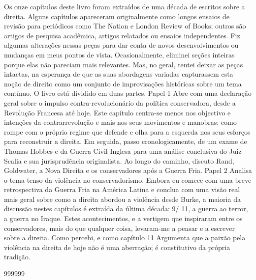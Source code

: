 Os onze capítulos deste livro foram extraídos de uma década de escritos sobre a direita. Alguns capítulos apareceram originalmente como longos ensaios de revisão para periódicos como The Nation e London Review of Books; outros são artigos de pesquisa acadêmica, artigos relatados ou ensaios independentes. Fiz algumas alterações nessas peças para dar conta de novos desenvolvimentos ou mudanças em meus pontos de vista. Ocasionalmente, eliminei seções inteiras porque elas não pareciam mais relevantes. Mas, no geral, tentei deixar as peças intactas, na esperança de que as suas abordagens variadas capturassem esta noção de direito como um conjunto de improvisações históricas sobre um tema contínuo. O livro está dividido em duas partes. Papel
 {\color{blue} 1}  
Abre com uma declaração geral sobre o impulso contra-revolucionário da política conservadora, desde a Revolução Francesa até hoje. Este capítulo centra-se menos nos objectivo e intenções da contrarrevolução e mais nos seus movimentos e manobras: como rompe com o próprio regime que defende e olha para a esquerda nos seus esforços para reconstruir a direita. Em seguida, passo cronologicamente, de um exame de Thomas Hobbes e da Guerra Civil Inglesa para uma análise conclusiva do Juiz Scalia e sua jurisprudência originalista. Ao longo do caminho, discuto Rand, Goldwater, a Nova Direita e os conservadores após a Guerra Fria. Papel
 {\color{blue} 2}  
Analisa o tema tenso da violência no conservadorismo. Embora eu comece com uma breve retrospectiva da Guerra Fria na América Latina e conclua com uma visão real mais geral sobre como a direita abordou a violência desde Burke, a maioria da discussão nestes capítulos é extraída da última década: 9/ 11, a guerra ao terror, a guerra no Iraque. Estes acontecimentos, e a vertigem que inspiraram entre os conservadores, mais do que qualquer coisa, levaram-me a pensar e a escrever sobre a direita. Como percebi, e como capítulo
 {\color{blue} 11}  
Argumenta que a paixão pela violência na direita de hoje não é uma aberração; é constitutivo da própria tradição.
 
\par
  
 
999999
